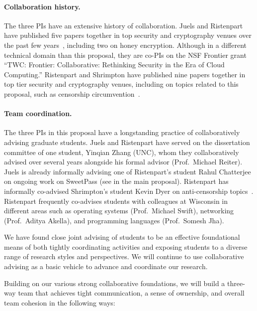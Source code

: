 \paragraph{Collaboration history.} The three PIs have an extensive history of
collaboration. Juels and Ristenpart have published five papers together in top
security and cryptography venues over the past few
years~\cite{HoneyEnc-SP:2014,HoneyEnc-EC:2014,zhang2012cross,ZhangEtAl:2014,farley:cloudmeter12},
including two on honey encryption. Although in a different technical domain than
this proposal, they are co-PIs on the NSF Frontier grant ``TWC: Frontier:
Collaborative: Rethinking Security in the Era of Cloud Computing.'' Ristenpart
and Shrimpton have published nine papers together in top tier security and
cryptography venues, including on topics related to this proposal, such as
censorship
circumvention~\cite{dyer2012peek,Dyer-2013,luchaup2014libfte,luchaup2014formatted}.

\paragraph{Team coordination.} The three PIs in this proposal have a
longstanding practice of collaboratively advising graduate students.  
Juels and Ristenpart have served on the dissertation committee of one student,
Yinqian Zhang (UNC), whom they collaboratively advised over several years
alongside his formal advisor (Prof.~Michael Reiter). Juels is already informally
advising one of Ristenpart's student Rahul Chatterjee on ongoing work on
SweetPass (see  in the main proposal).  
Ristenpart has informally co-advised Shrimpton's student Kevin
Dyer on anti-censorship topics~\cite{dyer2012peek,Dyer-2013,luchaup2014formatted}.  
Ristenpart frequently co-advises students with colleagues at Wisconsin in
different areas such as operating systems (Prof.~Michael Swift), networking
(Prof.~Aditya Akella), and programming languages (Prof.~Somesh Jha). 

We have found close joint advising of students to be an effective foundational
means of both tightly coordinating activities and exposing students to a diverse
range of research styles and perspectives. We will continue to use collaborative
advising as a basic vehicle to advance and coordinate our research. 

Building on our various strong collaborative foundations, we will build a
three-way team that achieves tight communication, a sense of ownership, and
overall team cohesion in the following ways:

